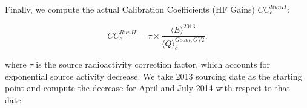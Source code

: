 Finally, we compute the actual Calibration Coefficients (HF Gains) ${CC}^{Run II}_{c}$:

\begin{center}
	\begin{equation}
		\label{eq:HF_Gains}
		{CC}^{Run II}_{c} = \tau \times \frac{{\langle{E}\rangle}^{2013}}{{\langle{Q}\rangle}^{Geom, OV2}_{c}}.
	\end{equation}
\end{center}

where $\tau$ is the source radioactivity correction factor, which accounts for exponential source activity decrease. We take 2013 sourcing date as the starting point and compute the decrease for April and July 2014 with respect to that date.
